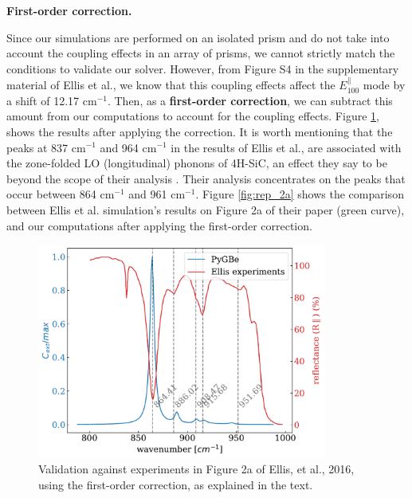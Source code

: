\textbf{First-order correction.} 

Since our simulations are performed on an isolated prism and do not take into account the coupling effects 
in an array of prisms, we cannot strictly match the conditions to validate our solver. However, from Figure S4 in the supplementary material of 
Ellis et al., we know that this coupling effects affect the $E^{\parallel}_{100}$ mode by a shift of 12.17 cm$^{-1}$. Then, as a 
\textbf{first-order correction}, we can subtract this amount from our computations to account for the coupling effects. Figure \ref{fig:val_2a}, 
shows the results after applying the correction. It is worth mentioning that the peaks at 837 cm$^{-1}$ and 964 cm$^{-1}$ in the results of Ellis et al., 
are associated with the zone-folded LO (longitudinal) phonons of 4H-SiC, an effect they say to be beyond the scope of their analysis \cite{ellis2016}. Their 
analysis concentrates on the peaks that occur between 864 cm$^{-1}$ and 961 cm$^{-1}$. 
Figure \ref{fig:rep_2a} shows the comparison between Ellis et al. simulation's results on Figure 2a of their paper (green curve), and our computations
after applying the first-order correction.

\begin{figure}
    \centering
    \includegraphics[width=0.85\textwidth]{validation_FOA_fig2a_Ellis.pdf} 
    \caption{Validation against experiments in Figure 2a of Ellis, et al., 2016, using the first-order correction, as explained in the text.}
    \label{fig:val_2a}
 \end{figure}

